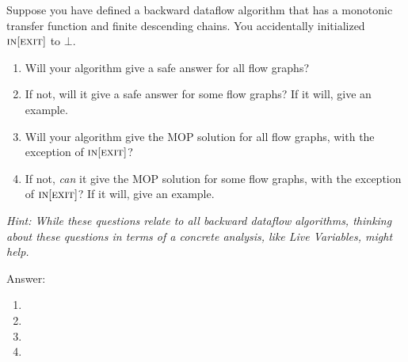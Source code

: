 \begin{problem}
\begin{problempart}
\end{problempart}

\pagebreak

\begin{problempart}
	Suppose you have defined a backward dataflow algorithm that has a monotonic transfer function and finite descending chains. You accidentally initialized $\textsc{in}[\textsc{exit}]$ to $\bot$.
	\begin{enumerate}
		\item Will your algorithm give a safe answer for all flow graphs?
		\item If not, will it give a safe answer for some flow graphs? If it will, give an example.
		\item Will your algorithm give the MOP solution for all flow graphs, with the exception of $\textsc{in}[\textsc{exit}]$?
		\item If not, \emph{can} it give the MOP solution for some flow graphs, with the exception of $\textsc{in}[\textsc{exit}]$? If it will, give an
		      example.
	\end{enumerate}
	\emph{Hint: While these questions relate to \emph{all} backward dataflow algorithms, thinking about these questions in terms of a concrete analysis, like Live Variables, might help.}

	\item Answer:
	\begin{enumerate}
		\item {\color{red}{Yes. Run the iterative algorithm with the correct initial values and the modified initial
		values in parallel. At each iteration, by monotonicity of $f$, the values at each node in
		the modified run will remain $\leq$ that in the correct run. Do not stop until both runs
		reach FP (the run converged first will just remain its fixed results). Then by induction,
		when both algorithms stop, the values under the modified algorithm (Modified-FP)
		will still be $\leq$ the FP values under the correct algorithm (MFP). And since we know
		MFP $\leq$ IDEAL, we have Modified-FP $\leq$ IDEAL as well.}}
		\item {\color{red}{No.}}
		\item {\color{red}{No. Any nontrivial example would act as a counterexample.}}
		\item {\color{red}{Just take the liveness analysis for example.}}
	\end{enumerate}

\end{problempart}
\end{problem}

